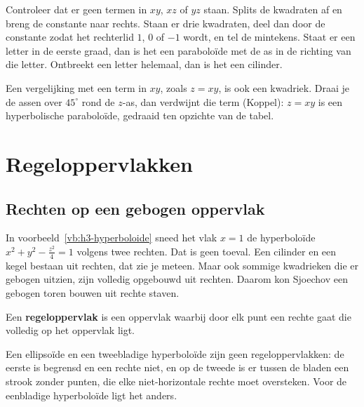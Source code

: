 \begin{werkwijze}
Controleer dat er geen termen in $xy$, $xz$ of $yz$ staan. Splits de kwadraten af en breng de constante naar rechts. Staan er drie kwadraten, deel dan door de constante zodat het rechterlid $1$, $0$ of $-1$ wordt, en tel de mintekens. Staat er een letter in de eerste graad, dan is het een paraboloïde met de as in de richting van die letter. Ontbreekt een letter helemaal, dan is het een cilinder.
\end{werkwijze}

Een vergelijking met een term in $xy$, zoals $z = xy$, is ook een kwadriek. Draai je de assen over $45^\circ$ rond de $z$-as, dan verdwijnt die term (Koppel): $z = xy$ is een hyperbolische paraboloïde, gedraaid ten opzichte van de tabel.

\begin{oefeningen}
\end{oefeningen}

\section{Regeloppervlakken}

\subsection{Rechten op een gebogen oppervlak}

In voorbeeld~\ref{vb:h3-hyperboloide} sneed het vlak $x = 1$ de hyperboloïde $x^2 + y^2 - \tfrac{z^2}{4} = 1$ volgens twee rechten. Dat is geen toeval. Een cilinder en een kegel bestaan uit rechten, dat zie je meteen. Maar ook sommige kwadrieken die er gebogen uitzien, zijn volledig opgebouwd uit rechten. Daarom kon Sjoechov een gebogen toren bouwen uit rechte staven.

\begin{theorie}
Een \textbf{\textcolor{accent}{regeloppervlak}} is een oppervlak waarbij door elk punt een rechte gaat die volledig op het oppervlak ligt.
\end{theorie}

Een ellipsoïde en een tweebladige hyperboloïde zijn geen regeloppervlakken: de eerste is begrensd en een rechte niet, en op de tweede is er tussen de bladen een strook zonder punten, die elke niet-horizontale rechte moet oversteken. Voor de eenbladige hyperboloïde ligt het anders.

